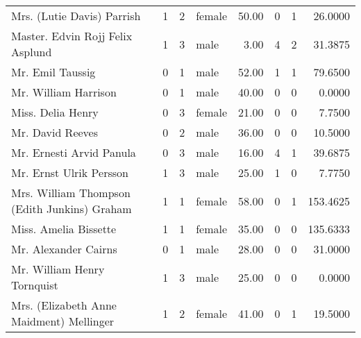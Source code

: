 \begin{tabular}{lrrlrrrr}
Mrs. (Lutie Davis) Parrish                         &         1 &       2 &  female &  50.00 &                        0 &                        1 &   26.0000 \\
Master. Edvin Rojj Felix Asplund                   &         1 &       3 &    male &   3.00 &                        4 &                        2 &   31.3875 \\
Mr. Emil Taussig                                   &         0 &       1 &    male &  52.00 &                        1 &                        1 &   79.6500 \\
Mr. William Harrison                               &         0 &       1 &    male &  40.00 &                        0 &                        0 &    0.0000 \\
Miss. Delia Henry                                  &         0 &       3 &  female &  21.00 &                        0 &                        0 &    7.7500 \\
Mr. David Reeves                                   &         0 &       2 &    male &  36.00 &                        0 &                        0 &   10.5000 \\
Mr. Ernesti Arvid Panula                           &         0 &       3 &    male &  16.00 &                        4 &                        1 &   39.6875 \\
Mr. Ernst Ulrik Persson                            &         1 &       3 &    male &  25.00 &                        1 &                        0 &    7.7750 \\
Mrs. William Thompson (Edith Junkins) Graham       &         1 &       1 &  female &  58.00 &                        0 &                        1 &  153.4625 \\
Miss. Amelia Bissette                              &         1 &       1 &  female &  35.00 &                        0 &                        0 &  135.6333 \\
Mr. Alexander Cairns                               &         0 &       1 &    male &  28.00 &                        0 &                        0 &   31.0000 \\
Mr. William Henry Tornquist                        &         1 &       3 &    male &  25.00 &                        0 &                        0 &    0.0000 \\
Mrs. (Elizabeth Anne Maidment) Mellinger           &         1 &       2 &  female &  41.00 &                        0 &                        1 &   19.5000 \\

\end{tabular}
